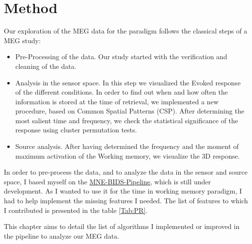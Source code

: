 \chapter{Method}




Our exploration of the MEG data for the paradigm follows the classical steps of a MEG study:

\begin{itemize}
    \item Pre-Processing of the data. Our study started with the verification and cleaning of the data.
    \item Analysis in the sensor space. In this step we visualized the Evoked response of the different conditions. In order to find out when and how often the information is stored at the time of retrieval, we implemented a new procedure, based on Common Spatial Patterns (CSP). After determining the most salient time and frequency, we check the statistical significance of the response using cluster permutation tests.
    \item Source analysis. After having determined the frequency and the moment of maximum activation of the Working memory, we visualize the 3D response.
\end{itemize}

In order to pre-process the data, and to analyze the data in the sensor and source space, I based myself on the \href{https://github.com/mne-tools/mne-bids-pipeline}{MNE-BIDS-Pipeline}, which is still under development. As I wanted to use it for the time in working memory paradigm, I had to help implement the missing features I needed. The list of features to which I contributed is presented in the table \ref{Tab:PR}.

This chapter aims to detail the list of algorithms I implemented or improved in the pipeline to analyze our MEG data.

